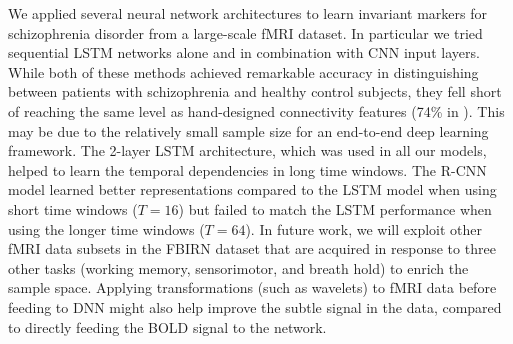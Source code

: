 \documentclass{article}
\begin{document}
We applied several neural network architectures to learn invariant markers for schizophrenia disorder from a large-scale fMRI dataset. In particular we tried sequential LSTM networks alone and in combination with CNN input layers. While both of these methods achieved remarkable accuracy in distinguishing between patients with schizophrenia and healthy control subjects, they fell short of reaching the same level as hand-designed connectivity features (74\% in \citep{Gheiratmand2017}). This may be due to the relatively small sample size for an end-to-end deep learning framework. The 2-layer LSTM architecture, which was used in all our models, helped to learn the temporal dependencies in long time windows. The R-CNN model learned better representations compared to the LSTM model when using short time windows ($T=16$) but failed to match the LSTM performance when using the longer time windows ($T=64$). In future work, we will exploit other fMRI data subsets in the FBIRN dataset that are acquired in response to three other tasks (working memory, sensorimotor, and breath hold) to enrich the sample space. Applying transformations (such as wavelets) to fMRI data before feeding to DNN might also help improve the subtle signal in the data, compared to directly feeding the BOLD signal to the network.





\end{document}
